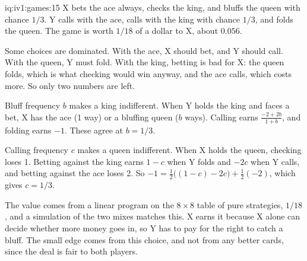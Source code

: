 \begin{solution}{iq:iv1:games:15}
X bets the ace always, checks the king, and bluffs the queen with chance $1/3$. Y calls with the ace, calls with the king with chance $1/3$, and folds the queen. The game is worth $1/18$ of a dollar to X, about $0.056$.

Some choices are dominated. With the ace, X should bet, and Y should call. With the queen, Y must fold. With the king, betting is bad for X: the queen folds, which is what checking would win anyway, and the ace calls, which costs more. So only two numbers are left.

Bluff frequency $b$ makes a king indifferent. When Y holds the king and faces a bet, X has the ace (1 way) or a bluffing queen ($b$ ways). Calling earns $\frac{-2 + 2b}{1 + b}$, and folding earns $-1$. These agree at $b = 1/3$.

Calling frequency $c$ makes a queen indifferent. When X holds the queen, checking loses 1. Betting against the king earns $1 - c$ when Y folds and $-2c$ when Y calls, and betting against the ace loses 2. So $-1 = \tfrac12\bigl((1 - c) - 2c\bigr) + \tfrac12(-2)$, which gives $c = 1/3$.

The value comes from a linear program on the $8 \times 8$ table of pure strategies, $1/18$, and a simulation of the two mixes matches this. X earns it because X alone can decide whether more money goes in, so Y has to pay for the right to catch a bluff. The small edge comes from this choice, and not from any better cards, since the deal is fair to both players.

\end{solution}

